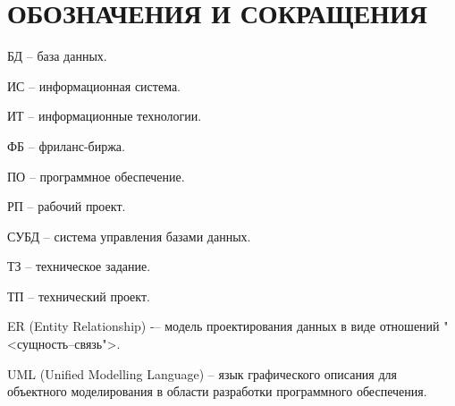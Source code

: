\section*{ОБОЗНАЧЕНИЯ И СОКРАЩЕНИЯ}

БД -- база данных.

ИС -- информационная система.

ИТ -- информационные технологии. 

ФБ -- фриланс-биржа.

ПО -- программное обеспечение.

РП -- рабочий проект.

СУБД -- система управления базами данных.

ТЗ -- техническое задание.

ТП -- технический проект.

ER (Entity Relationship) -– модель проектирования данных в виде отношений "<сущность–связь">.

UML (Unified Modelling Language) -- язык графического описания для объектного моделирования в области разработки программного обеспечения.
